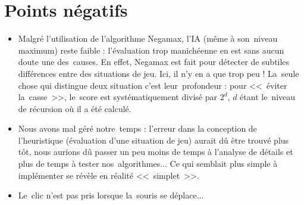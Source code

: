 \section{Points négatifs}
\begin{itemize}

	\item Malgré l'utilisation de l'algorithme Negamax, l'IA (même à son~niveau maximum) reste faible : 
            l'évaluation trop manichéenne en est sans aucun doute une des~causes. En effet, Negamax est fait pour 
            détecter de subtiles différences entre des situations de jeu. Ici, il n'y en a que trop peu ! 
            La~seule chose qui distingue deux situation c'est leur~profondeur : pour <<~éviter la~casse~>>, 
            le~score est systématiquement divisé par $2^d$, $d$ étant le~niveau de récursion où il a été calculé. 
            
    \item Nous avons mal géré notre~temps : l'erreur dans la conception de l'heuristique (évaluation d'une situation de jeu) 
            aurait dû être trouvé plus tôt, nous aurions dû passer un peu moins de temps à l'analyse de détails 
            et plus de temps à tester nos~algorithmes... Ce qui semblait plus simple à implémenter 
            se révèle en réalité <<~simplet~>>.
            
    \item Le~clic n'est pas pris lorsque la~souris se déplace...
    
\end{itemize}